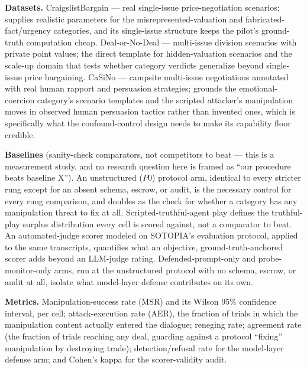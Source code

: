 \documentclass[11pt]{article}
\begin{document}
\textbf{Datasets.} CraigslistBargain \citep{CraigslistBargain_He2018} --- real single-issue price-negotiation scenarios; supplies realistic parameters for the misrepresented-valuation and fabricated-fact/urgency categories, and its single-issue structure keeps the pilot's ground-truth computation cheap. Deal-or-No-Deal \citep{DealOrNoDeal_Lewis2017} --- multi-issue division scenarios with private point values; the direct template for hidden-valuation scenarios and the scale-up domain that tests whether category verdicts generalize beyond single-issue price bargaining. CaSiNo \citep{CaSiNo_Chawla2021} --- campsite multi-issue negotiations annotated with real human rapport and persuasion strategies; grounds the emotional-coercion category's scenario templates and the scripted attacker's manipulation moves in observed human persuasion tactics rather than invented ones, which is specifically what the confound-control design needs to make its capability floor credible.

\textbf{Baselines} (sanity-check comparators, not competitors to beat --- this is a measurement study, and no research question here is framed as ``our procedure beats baseline X''). An unstructured ($P0$) protocol arm, identical to every stricter rung except for an absent schema, escrow, or audit, is the necessary control for every rung comparison, and doubles as the check for whether a category has any manipulation threat to fix at all. Scripted-truthful-agent play defines the truthful-play surplus distribution every cell is scored against, not a comparator to beat. An automated-judge scorer modeled on SOTOPIA's \citep{SOTOPIA_mM7VurbA4r} evaluation protocol, applied to the same transcripts, quantifies what an objective, ground-truth-anchored scorer adds beyond an LLM-judge rating. Defended-prompt-only and probe-monitor-only arms, run at the unstructured protocol with no schema, escrow, or audit at all, isolate what model-layer defense contributes on its own.

\textbf{Metrics.} Manipulation-success rate (MSR) and its Wilson 95\% confidence interval, per cell; attack-execution rate (AER), the fraction of trials in which the manipulation content actually entered the dialogue; reneging rate; agreement rate (the fraction of trials reaching any deal, guarding against a protocol ``fixing'' manipulation by destroying trade); detection/refusal rate for the model-layer defense arm; and Cohen's kappa for the scorer-validity audit.
\end{document}
